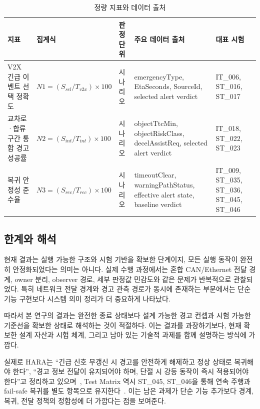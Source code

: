 \documentclass[10pt,a4paper,twocolumn]{article}
\begin{document}
\begin{table}[t]
\caption{정량 지표와 데이터 출처}
\label{tab:metric_sources}
\centering
\footnotesize
\setlength{\tabcolsep}{4pt}
\begin{tabularx}{\textwidth}{>{\raggedright\arraybackslash}p{3.0cm} >{\centering\arraybackslash}p{3.0cm} >{\raggedright\arraybackslash}p{1.9cm} >{\raggedright\arraybackslash}X >{\raggedright\arraybackslash}p{2.8cm}}
\toprule
지표 & 집계식 & 판정 단위 & 주요 데이터 출처 & 대표 시험 \\
\midrule
V2X 긴급 이벤트 선택 정확도 & $N1=(S_{sel}/T_{v2x})\times100$ & 시나리오 & emergencyType, EtaSeconds, SourceId, selected alert verdict & IT\_006, ST\_016, ST\_017 \\
교차로·합류구간 통합 경고 성공률 & $N2=(S_{int}/T_{int})\times100$ & 시나리오 & objectTtcMin, objectRiskClass, decelAssistReq, selected alert verdict & IT\_018, ST\_022, ST\_023 \\
복귀 안정성 준수율 & $N3=(S_{rec}/T_{rec})\times100$ & 시나리오 & timeoutClear, warningPathStatus, effective alert state, baseline verdict & IT\_009, ST\_035, ST\_036, ST\_045, ST\_046 \\
\bottomrule
\end{tabularx}
\end{table}

\subsection{한계와 해석}

현재 결과는 실행 가능한 구조와 시험 기반을 확보한 단계이지, 모든 실행 동작이 완전히 안정화되었다는 의미는 아니다. 실제 수행 과정에서는 혼합 CAN/Ethernet 전달 경계, owner 분리, observer 경로, 세부 판정값 민감도와 같은 문제가 반복적으로 관찰되었다. 특히 네트워크 전달 경계와 경고 관측 경로가 동시에 존재하는 부분에서는 단순 기능 구현보다 시스템 의미 정리가 더 중요하게 나타났다.

따라서 본 연구의 결과는 완전한 종료 상태보다 설계 가능한 경고 컨셉과 시험 가능한 기준선을 확보한 상태로 해석하는 것이 적절하다. 이는 결과를 과장하기보다, 현재 확보한 설계 자산과 시험 체계, 그리고 남아 있는 기술적 과제를 함께 설명하는 방식에 가깝다.

실제로 HARA는 ``긴급 신호 무갱신 시 경고를 안전하게 해제하고 정상 상태로 복귀해야 한다'', ``경고 정보 전달이 유지되어야 하며, 단절 시 강등 동작이 즉시 적용되어야 한다''고 정리하고 있으며~\cite{hara}, Test Matrix 역시 ST\_045, ST\_046을 통해 연속 주행과 fail-safe 복귀를 별도 항목으로 유지한다~\cite{master_test_matrix}. 이는 남은 과제가 단순 기능 추가보다 경계, 복귀, 전달 정책의 정합성에 더 가깝다는 점을 보여준다.
\end{document}
